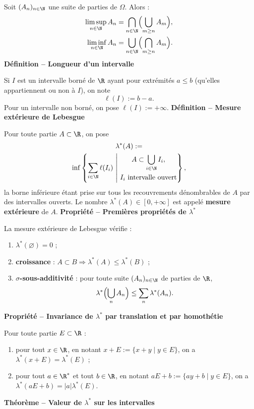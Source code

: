 Soit $(A_n)_{n\in\N}$ une suite de parties de $\Omega$. Alors :
\[
\begin{aligned}
\limsup_{n\in\N}A_n&=\bigcap_{n\in\N}\Bigl(\bigcup_{m\ge n}A_m\Bigr),\\
\liminf_{n\in\N}A_n&=\bigcup_{n\in\N}\Bigl(\bigcap_{m\ge n}A_m\Bigr).
\end{aligned}
\]
\textbf{Définition – Longueur d’un intervalle}

Si $I$ est un intervalle borné de $\R$ ayant pour extrémités $a\le b$ (qu’elles appartiennent ou non à $I$), on note
\[\ell(I):=b-a.\]
Pour un intervalle non borné, on pose $\ell(I):=+\infty$.
\textbf{Définition – Mesure extérieure de Lebesgue}

Pour toute partie $A\subset\R$, on pose
\[
\begin{gathered}
\lambda^*(A):=\\
\inf\left\{\sum_{i\in\N}\ell(I_i)\ \middle|\ \begin{gathered}A\subset\bigcup_{i\in\N}I_i,\\ I_i\text{ intervalle ouvert}\end{gathered}\right\},
\end{gathered}
\]
la borne inférieure étant prise sur tous les recouvrements dénombrables de $A$ par des intervalles ouverts. Le nombre $\lambda^*(A)\in[0,+\infty]$ est appelé \textbf{mesure extérieure} de $A$.
\textbf{Propriété – Premières propriétés de $\lambda^*$}

La mesure extérieure de Lebesgue vérifie :
\begin{enumerate}
\item $\lambda^*(\varnothing)=0$ ;
\item \textbf{croissance} : $A\subset B\Rightarrow\lambda^*(A)\le\lambda^*(B)$ ;
\item \textbf{$\sigma$-sous-additivité} : pour toute suite $(A_n)_{n\in\N}$ de parties de $\R$,
\[\lambda^*\Bigl(\bigcup_n A_n\Bigr)\le\sum_n\lambda^*(A_n).\]
\end{enumerate}
\textbf{Propriété – Invariance de $\lambda^*$ par translation et par homothétie}

Pour toute partie $E\subset\R$ :
\begin{enumerate}
\item pour tout $x\in\R$, en notant $x+E:=\{x+y\mid y\in E\}$, on a $\lambda^*(x+E)=\lambda^*(E)$ ;
\item pour tout $a\in\R^*$ et tout $b\in\R$, en notant $aE+b:=\{ay+b\mid y\in E\}$, on a $\lambda^*(aE+b)=|a|\lambda^*(E)$.
\end{enumerate}
\textbf{Théorème – Valeur de $\lambda^*$ sur les intervalles}

